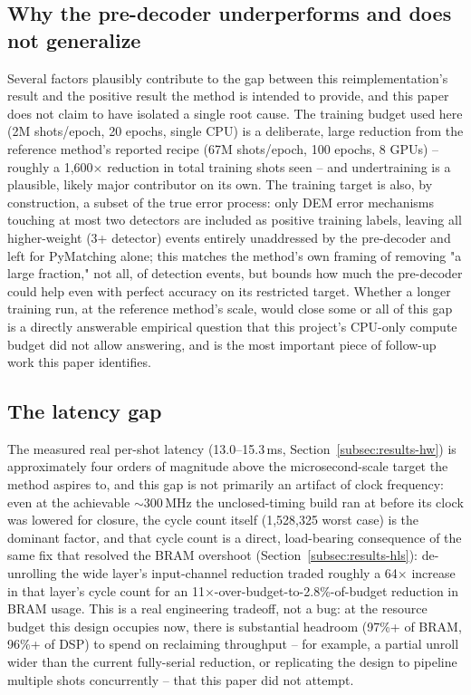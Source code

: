 \documentclass[pdflatex,sn-basic]{sn-jnl}
\begin{document}
\subsection{Why the pre-decoder underperforms and does not generalize}\label{subsec:discussion-why}
Several factors plausibly contribute to the gap between this reimplementation's result and the positive result the method is intended to provide, and this paper does not claim to have isolated a single root cause. The training budget used here (2M shots/epoch, 20 epochs, single CPU) is a deliberate, large reduction from the reference method's reported recipe (67M shots/epoch, 100 epochs, 8 GPUs) -- roughly a 1{,}600\(\times\) reduction in total training shots seen -- and undertraining is a plausible, likely major contributor on its own. The training target is also, by construction, a subset of the true error process: only DEM error mechanisms touching at most two detectors are included as positive training labels, leaving all higher-weight (3+ detector) events entirely unaddressed by the pre-decoder and left for PyMatching alone; this matches the method's own framing of removing "a large fraction," not all, of detection events, but bounds how much the pre-decoder could help even with perfect accuracy on its restricted target. Whether a longer training run, at the reference method's scale, would close some or all of this gap is a directly answerable empirical question that this project's CPU-only compute budget did not allow answering, and is the most important piece of follow-up work this paper identifies.

\subsection{The latency gap}\label{subsec:discussion-latency}
The measured real per-shot latency (13.0--15.3\,ms, Section~\ref{subsec:results-hw}) is approximately four orders of magnitude above the microsecond-scale target the method aspires to, and this gap is not primarily an artifact of clock frequency: even at the achievable \(\sim\)300\,MHz the unclosed-timing build ran at before its clock was lowered for closure, the cycle count itself (1{,}528{,}325 worst case) is the dominant factor, and that cycle count is a direct, load-bearing consequence of the same fix that resolved the BRAM overshoot (Section~\ref{subsec:results-hls}): de-unrolling the wide layer's input-channel reduction traded roughly a 64\(\times\) increase in that layer's cycle count for an 11\(\times\)-over-budget-to-2.8\%-of-budget reduction in BRAM usage. This is a real engineering tradeoff, not a bug: at the resource budget this design occupies now, there is substantial headroom (97\%+ of BRAM, 96\%+ of DSP) to spend on reclaiming throughput -- for example, a partial unroll wider than the current fully-serial reduction, or replicating the design to pipeline multiple shots concurrently -- that this paper did not attempt.
\end{document}
